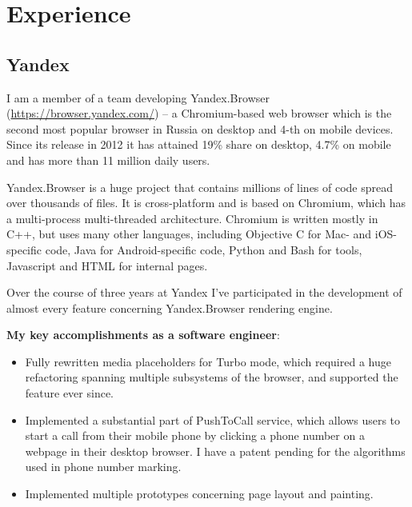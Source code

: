 \documentclass[11pt,a4paper]{moderncv}
\begin{document}
\makecvtitle

\section{Experience}
\subsection{Yandex}
  I am a member of a team developing Yandex.Browser (\url{https://browser.yandex.com/}) -- a Chromium-based web browser which is the second most popular browser in Russia on desktop and 4-th on mobile devices.
  Since its release in 2012 it has attained 19\% share on desktop, 4.7\% on mobile and has more than 11 million daily users.

  Yandex.Browser is a huge project that contains millions of lines of code spread over thousands of files. It is cross-platform and is based on Chromium, which has a multi-process multi-threaded architecture.
  Chromium is written mostly in C++, but uses many other languages, including Objective C for Mac- and iOS-specific code, Java for Android-specific code, Python and Bash for tools, Javascript and HTML for internal pages.

  Over the course of three years at Yandex I've participated in the development of almost every feature concerning Yandex.Browser rendering engine.

  \medskip
  \textbf{My key accomplishments as a software engineer}:
  \smallskip
  \begin{itemize}%
    \item Fully rewritten media placeholders for Turbo mode, which required a huge refactoring spanning multiple subsystems of the browser, and supported the feature ever since.
    \item Implemented a substantial part of PushToCall service, which allows users to start a call from their mobile phone by clicking a phone number on a webpage in their desktop browser.
      I have a patent pending for the algorithms used in phone number marking.
    \item Implemented multiple prototypes concerning page layout and painting.
  \end{itemize}
\end{document}
